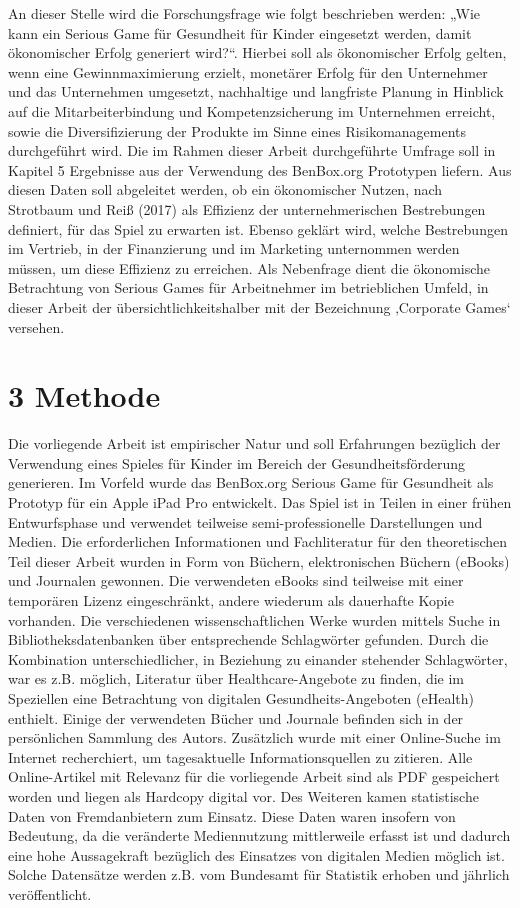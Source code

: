 \documentclass[
  a4paper,
  DIV=11,
  numbers=noendperiod,
  onecolumn,
  oneside,
  a4paper]{scrartcl}
\begin{document}
An dieser Stelle wird die Forschungsfrage wie folgt beschrieben werden:
„Wie kann ein Serious Game für Gesundheit für Kinder eingesetzt werden,
damit ökonomischer Erfolg generiert wird?{}``. Hierbei soll als
ökonomischer Erfolg gelten, wenn eine Gewinnmaximierung erzielt,
monetärer Erfolg für den Unternehmer und das Unternehmen umgesetzt,
nachhaltige und langfriste Planung in Hinblick auf die
Mitarbeiterbindung und Kompetenzsicherung im Unternehmen erreicht, sowie
die Diversifizierung der Produkte im Sinne eines Risikomanagements
durchgeführt wird. Die im Rahmen dieser Arbeit durchgeführte Umfrage
soll in Kapitel 5 Ergebnisse aus der Verwendung des BenBox.org
Prototypen liefern. Aus diesen Daten soll abgeleitet werden, ob ein
ökonomischer Nutzen, nach Strotbaum und Reiß (2017) als Effizienz der
unternehmerischen Bestrebungen definiert, für das Spiel zu erwarten ist.
Ebenso geklärt wird, welche Bestrebungen im Vertrieb, in der
Finanzierung und im Marketing unternommen werden müssen, um diese
Effizienz zu erreichen. Als Nebenfrage dient die ökonomische Betrachtung
von Serious Games für Arbeitnehmer im betrieblichen Umfeld, in dieser
Arbeit der übersichtlichkeitshalber mit der Bezeichnung ‚Corporate
Games` versehen.

\section{3 Methode}\label{methode}

Die vorliegende Arbeit ist empirischer Natur und soll Erfahrungen
bezüglich der Verwendung eines Spieles für Kinder im Bereich der
Gesundheitsförderung generieren. Im Vorfeld wurde das BenBox.org Serious
Game für Gesundheit als Prototyp für ein Apple iPad Pro entwickelt. Das
Spiel ist in Teilen in einer frühen Entwurfsphase und verwendet
teilweise semi-professionelle Darstellungen und Medien. Die
erforderlichen Informationen und Fachliteratur für den theoretischen
Teil dieser Arbeit wurden in Form von Büchern, elektronischen Büchern
(eBooks) und Journalen gewonnen. Die verwendeten eBooks sind teilweise
mit einer temporären Lizenz eingeschränkt, andere wiederum als
dauerhafte Kopie vorhanden. Die verschiedenen wissenschaftlichen Werke
wurden mittels Suche in Bibliotheksdatenbanken über entsprechende
Schlagwörter gefunden. Durch die Kombination unterschiedlicher, in
Beziehung zu einander stehender Schlagwörter, war es z.B. möglich,
Literatur über Healthcare-Angebote zu finden, die im Speziellen eine
Betrachtung von digitalen Gesundheits-Angeboten (eHealth) enthielt.
Einige der verwendeten Bücher und Journale befinden sich in der
persönlichen Sammlung des Autors. Zusätzlich wurde mit einer
Online-Suche im Internet recherchiert, um tagesaktuelle
Informationsquellen zu zitieren. Alle Online-Artikel mit Relevanz für
die vorliegende Arbeit sind als PDF gespeichert worden und liegen als
Hardcopy digital vor. Des Weiteren kamen statistische Daten von
Fremdanbietern zum Einsatz. Diese Daten waren insofern von Bedeutung, da
die veränderte Mediennutzung mittlerweile erfasst ist und dadurch eine
hohe Aussagekraft bezüglich des Einsatzes von digitalen Medien möglich
ist. Solche Datensätze werden z.B. vom Bundesamt für Statistik erhoben
und jährlich veröffentlicht.
\end{document}
